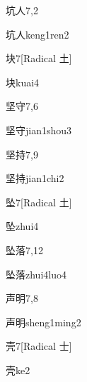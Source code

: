 \begin{entry}{坑人}{7,2}
  \begin{phonetics}{坑人}{keng1ren2}
  \end{phonetics}
\end{entry}

\begin{entry}{块}{7}[Radical 土]
  \begin{phonetics}{块}{kuai4}
  \end{phonetics}
\end{entry}

\begin{entry}{坚守}{7,6}
  \begin{phonetics}{坚守}{jian1shou3}
  \end{phonetics}
\end{entry}

\begin{entry}{坚持}{7,9}
  \begin{phonetics}{坚持}{jian1chi2}
  \end{phonetics}
\end{entry}

\begin{entry}{坠}{7}[Radical 土]
  \begin{phonetics}{坠}{zhui4}
  \end{phonetics}
\end{entry}

\begin{entry}{坠落}{7,12}
  \begin{phonetics}{坠落}{zhui4luo4}
  \end{phonetics}
\end{entry}

\begin{entry}{声明}{7,8}
  \begin{phonetics}{声明}{sheng1ming2}
  \end{phonetics}
\end{entry}

\begin{entry}{壳}{7}[Radical 士]
  \begin{phonetics}{壳}{ke2}
  \end{phonetics}
\end{entry}

